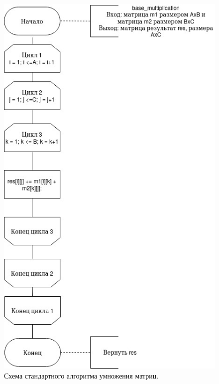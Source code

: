 \documentclass[12pt]{report}
\begin{document}
\begin{figure}[h]
	\centering
	\includegraphics[scale=0.85]{base.jpg}
	\caption{Схема стандартного алгоритма умножения матриц.}
	\label{fig:mpr}
\end{figure}
\end{document}
